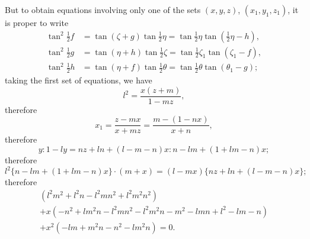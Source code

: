 \documentclass[11pt,a4paper]{book}
\begin{document}
But to obtain equations involving only one of the sets $(x, y, z)$, $(x_1, y_1, z_1)$, it is proper to write
\begin{align*}
\tan^2\tfrac{1}{2}f &= \tan(\zeta + g)\tan\tfrac{1}{2}\eta = \tan\tfrac{1}{2}\eta\tan(\tfrac{1}{2}\eta - h),\\
\tan^2\tfrac{1}{2}g &= \tan(\eta + h)\tan\tfrac{1}{2}\zeta = \tan\tfrac{1}{2}\zeta_1\tan(\zeta_1 - f),\\
\tan^2\tfrac{1}{2}h &= \tan(\eta + f)\tan\tfrac{1}{2}\theta = \tan\tfrac{1}{2}\theta\tan(\theta_1 - g);
\end{align*}
taking the first set of equations, we have
\[
l^2 = \frac{x(z + m)}{1 - mz},
\]
therefore
\[
x_1 = \frac{z - mx}{x + mz} = \frac{m - (1 - nx)}{x + n},
\]
therefore
\[
y : 1 - ly = nz + ln + (l - m - n)x : n - lm + (1 + lm - n)x;
\]
therefore
\[
l^2\{n - lm + (1 + lm - n)x\}\cdot(m + x) = (l - mx)\{nz + ln + (l - m - n)x\};
\]
therefore
\begin{multline*}
(l^2m^2 + l^2n - l^2mn^2 + l^2m^2n^2)\\
+ x(-n^2 + lm^2n - l^2mn^2 - l^2m^2n - m^2 - lmn + l^2 - lm - n)\\
+ x^2(-lm + m^2n - n^2 - lm^2n) = 0.
\end{multline*}
\end{document}
